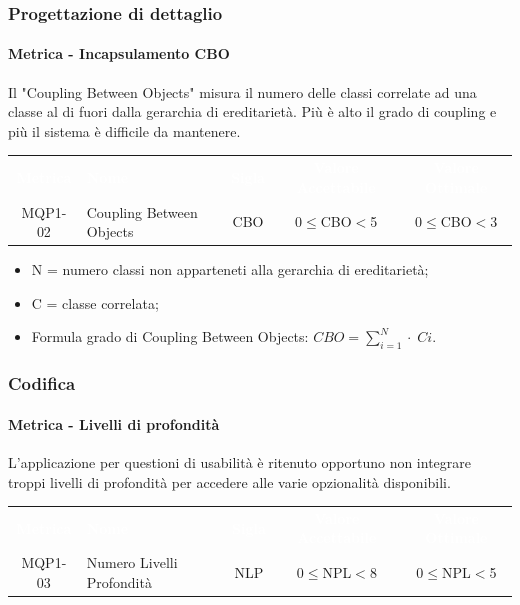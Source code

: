     \subsubsection{Progettazione di dettaglio}
        \paragraph{Metrica - Incapsulamento CBO}
        Il "Coupling Between Objects" misura il numero delle classi correlate ad una classe al di fuori dalla gerarchia di ereditarietà. Più è alto il grado di coupling e più il sistema è difficile da mantenere.
        
        \renewcommand{\arraystretch}{1.5}
        \begin{longtable}{ c C{4cm} c c c}
        \textcolor{white}{\textbf{Metrica}} & \textcolor{white}{\textbf{Nome}} & \textcolor{white}{\textbf{Sigla}} & \textcolor{white}{\textbf{Valore Accettabile}} & \textcolor{white}{\textbf{Valore Ottimale}}\\
        MQP1-02 & Coupling Between Objects & CBO & 0$\leq$CBO$<$5 & 0$\leq$CBO$<$3 \\	     
        \end{longtable}

        \begin{itemize}
        \item N = numero classi non apparteneti alla gerarchia di ereditarietà;
        \item C = classe correlata;
        \item Formula grado di Coupling Between Objects: \begin{math}{CBO = {\sum_{i=1}^{N} \cdot \; Ci}}\end{math}.
        \end{itemize}
        
    \subsubsection{Codifica}
        \paragraph{Metrica - Livelli di profondità}
        L'applicazione per questioni di usabilità è ritenuto opportuno non integrare troppi livelli di profondità per accedere alle varie opzionalità disponibili.

        \renewcommand{\arraystretch}{1.5}
        \begin{longtable}{ c C{4cm} c c c}
        \textcolor{white}{\textbf{Metrica}} & \textcolor{white}{\textbf{Nome}} & \textcolor{white}{\textbf{Sigla}} & \textcolor{white}{\textbf{Valore Accettabile}} & \textcolor{white}{\textbf{Valore Ottimale}}\\
        MQP1-03 & Numero Livelli Profondità & NLP & 0$\leq$NPL$<$8 & 0$\leq$NPL$<$5 \\	     
        \end{longtable}

